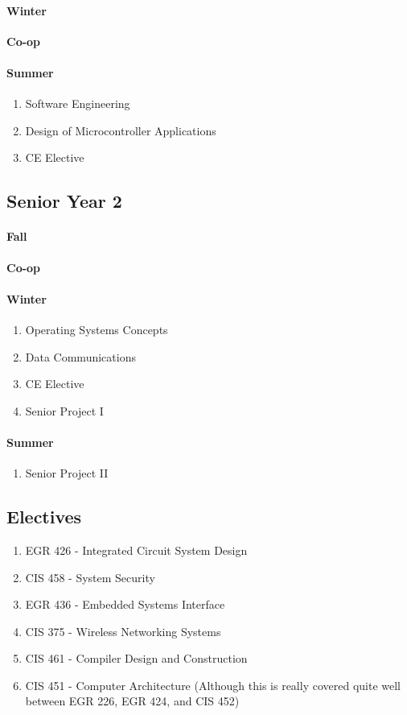 \documentclass[12pt]{article}
\numberwithin{figure}{section}
\numberwithin{equation}{section}
\begin{document}
{\paragraph{Winter}\label{senior-winter-1}
\textbf{Co-op}
\paragraph{Summer}\label{senior-summer-1}
\begin{enumerate}
    \item   Software Engineering
    \item   Design of Microcontroller Applications
    \item   CE Elective
\end{enumerate}

\subsection{Senior Year 2}\label{senior-year-2}
\paragraph{Fall}\label{senior-fall-2}
\textbf{Co-op}
\paragraph{Winter}\label{senior-winter-2}
\begin{enumerate}
    \item   Operating Systems Concepts
    \item   Data Communications
    \item   CE Elective
    \item   Senior Project I
\end{enumerate}
\paragraph{Summer}\label{senior-summer-2}
\begin{enumerate}
    \item   Senior Project II
\end{enumerate}

\subsection{Electives}\label{suggested-electives}
\begin{enumerate}
    \item   EGR 426 - Integrated Circuit System Design
    \item   CIS 458 - System Security
    \item   EGR 436 - Embedded Systems Interface
    \item   CIS 375 - Wireless Networking Systems
    \item   CIS 461 - Compiler Design and Construction
    \item   CIS 451 - Computer Architecture (Although this is really covered quite well between EGR 226, EGR 424, and CIS 452)
\end{enumerate}

}
\end{document}

